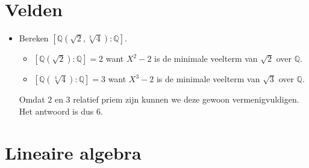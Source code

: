 \documentclass[main.tex]{subfiles}
\begin{document}
 \section{Velden}
 \label{sec:velden}

 \begin{itemize}
 \item Bereken $[\mathbb{Q}(\sqrt{2},\sqrt[3]{4}):\mathbb{Q}]$.
   \begin{itemize}
   \item $[\mathbb{Q}(\sqrt{2}):\mathbb{Q}] = 2$ want $X^{2}-2$ is de minimale veelterm van $\sqrt{2}$ over $\mathbb{Q}$.
   \item $[\mathbb{Q}(\sqrt[3]{4}):\mathbb{Q}] = 3$ want $X^{3}-2$ is de minimale veelterm van $\sqrt{3}$ over $\mathbb{Q}$.
   \end{itemize}
   Omdat $2$ en $3$ relatief priem zijn kunnen we deze gewoon vermenigvuldigen.
   Het antwoord is dus $6$.
 \end{itemize}


 \section{Lineaire algebra}
 \label{sec:lineaire-algebra}
\end{document}
